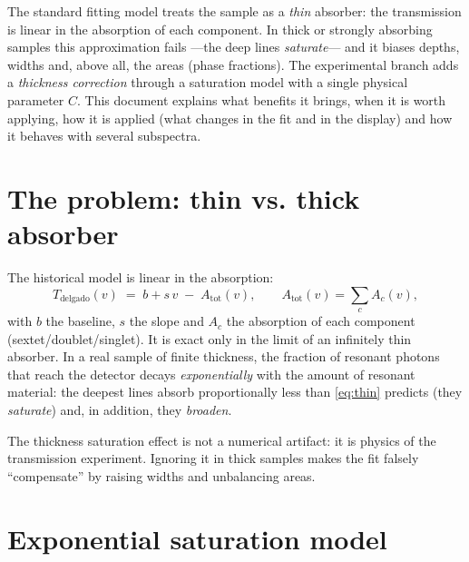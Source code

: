 \noindent
The standard fitting model treats the sample as a \emph{thin} absorber:
the transmission is linear in the absorption of each component. In thick
or strongly absorbing samples this approximation fails —the deep lines \emph{saturate}—
and it biases depths, widths and, above all, the areas (phase fractions).
The experimental branch adds a \emph{thickness correction} through a
saturation model with a single physical parameter $C$. This document explains
what benefits it brings, when it is worth applying, how it is applied (what
changes in the fit and in the display) and how it behaves with several subspectra.



\bigskip

\section{The problem: thin vs. thick absorber}

The historical model is linear in the absorption:
\begin{equation}
  T_{\text{delgado}}(v) \;=\; b + s\,v \;-\; A_{\text{tot}}(v),
  \qquad A_{\text{tot}}(v)=\sum_{c} A_c(v),
  \label{eq:thin}
\end{equation}
with $b$ the baseline, $s$ the slope and $A_c$ the absorption of each component
(sextet/doublet/singlet). It is exact only in the limit of an
infinitely thin absorber. In a real sample of finite thickness, the fraction of
resonant photons that reach the detector decays \emph{exponentially} with the amount of
resonant material: the deepest lines absorb proportionally less than
\eqref{eq:thin} predicts (they \emph{saturate}) and, in addition, they \emph{broaden}.

\begin{nota}
The thickness saturation effect is not a numerical artifact: it is physics of the
transmission experiment. Ignoring it in thick samples makes the fit falsely
``compensate'' by raising widths and unbalancing areas.
\end{nota}

\section{Exponential saturation model}

